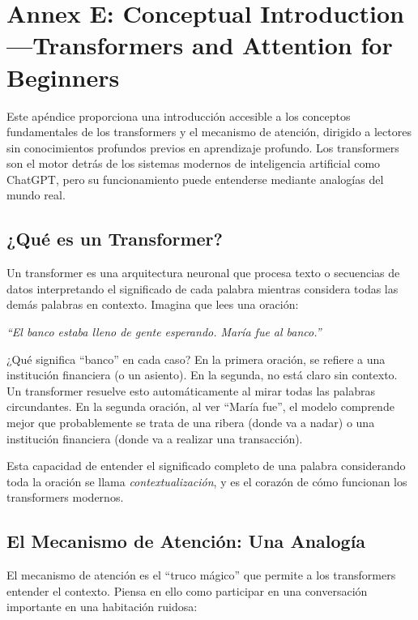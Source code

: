 \section{Annex E: Conceptual Introduction---Transformers and Attention for Beginners}
\label{sec:annex-tutorial}

Este apéndice proporciona una introducción accesible a los conceptos fundamentales de los transformers y el mecanismo de atención, dirigido a lectores sin conocimientos profundos previos en aprendizaje profundo. Los transformers son el motor detrás de los sistemas modernos de inteligencia artificial como ChatGPT, pero su funcionamiento puede entenderse mediante analogías del mundo real.

\subsection{¿Qué es un Transformer?}

Un transformer es una arquitectura neuronal que procesa texto o secuencias de datos interpretando el significado de cada palabra mientras considera todas las demás palabras en contexto. Imagina que lees una oración:

\begin{center}
\textit{``El banco estaba lleno de gente esperando. María fue al banco.''}
\end{center}

¿Qué significa ``banco'' en cada caso? En la primera oración, se refiere a una institución financiera (o un asiento). En la segunda, no está claro sin contexto. Un transformer resuelve esto automáticamente al mirar todas las palabras circundantes. En la segunda oración, al ver ``María fue'', el modelo comprende mejor que probablemente se trata de una ribera (donde va a nadar) o una institución financiera (donde va a realizar una transacción).

Esta capacidad de entender el significado completo de una palabra considerando toda la oración se llama \emph{contextualización}, y es el corazón de cómo funcionan los transformers modernos.

\subsection{El Mecanismo de Atención: Una Analogía}

El mecanismo de atención es el ``truco mágico'' que permite a los transformers entender el contexto. Piensa en ello como participar en una conversación importante en una habitación ruidosa:

